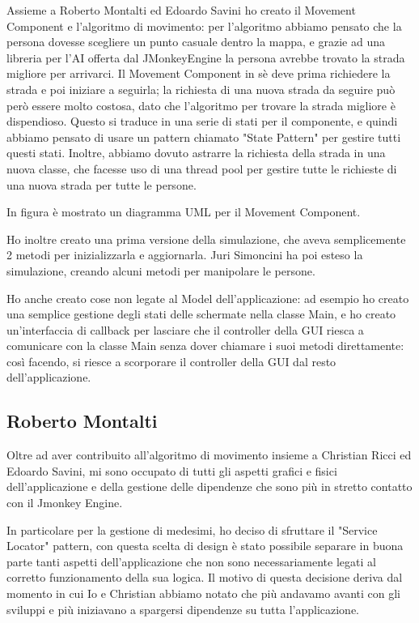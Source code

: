 \documentclass[a4paper,12pt]{report}
\begin{document}
Assieme a Roberto Montalti ed Edoardo Savini ho creato il Movement Component e l'algoritmo di movimento: per l'algoritmo abbiamo pensato che la persona dovesse scegliere un punto casuale dentro la mappa, e grazie ad una libreria per l'AI offerta dal JMonkeyEngine la persona avrebbe trovato la strada migliore per arrivarci. Il Movement Component in sè deve prima richiedere la strada e poi iniziare a seguirla; la richiesta di una nuova strada da seguire può però essere molto costosa, dato che l'algoritmo per trovare la strada migliore è dispendioso. Questo si traduce in una serie di stati per il componente, e quindi abbiamo pensato di usare un pattern chiamato "State Pattern" per gestire tutti questi stati. Inoltre, abbiamo dovuto astrarre la richiesta della strada in una nuova classe, che facesse uso di una thread pool per gestire tutte le richieste di una nuova strada per tutte le persone.

In figura è mostrato un diagramma UML per il Movement Component.

Ho inoltre creato una prima versione della simulazione, che aveva semplicemente 2 metodi per inizializzarla e aggiornarla. Juri Simoncini ha poi esteso la simulazione, creando alcuni metodi per manipolare le persone.

Ho anche creato cose non legate al Model dell'applicazione: ad esempio ho creato una semplice gestione degli stati delle schermate nella classe Main, e ho creato un'interfaccia di callback per lasciare che il controller della GUI riesca a comunicare con la classe Main senza dover chiamare i suoi metodi direttamente: così facendo, si riesce a scorporare il controller della GUI dal resto dell'applicazione.

\subsection{Roberto Montalti}

Oltre ad aver contribuito all'algoritmo di movimento insieme a Christian Ricci ed Edoardo Savini, mi sono occupato di tutti gli aspetti grafici e fisici dell'applicazione e della gestione delle dipendenze che sono più in stretto contatto con il Jmonkey Engine.

In particolare per la gestione di medesimi, ho deciso di sfruttare il "Service Locator" pattern, con questa scelta di design è stato possibile separare in buona parte tanti aspetti dell'applicazione che non sono necessariamente legati al corretto funzionamento della sua logica.
Il motivo di questa decisione deriva dal momento in cui Io e Christian abbiamo notato che più andavamo avanti con gli sviluppi e più iniziavano a spargersi dipendenze su tutta l'applicazione.
\end{document}
